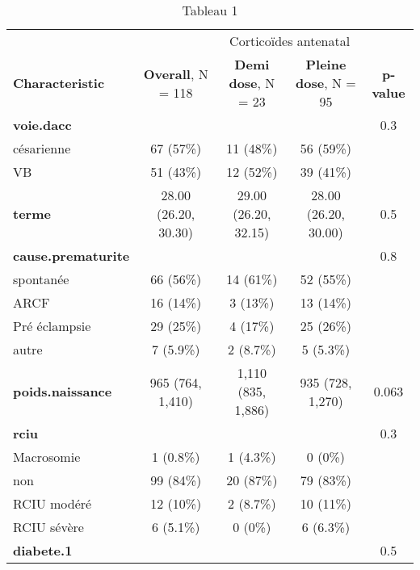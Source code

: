 \documentclass[
  10pt,
  a4paper,
]{scrartcl}
\begin{document}
\begin{table}

\caption{\label{tab:xtable1}Tableau 1}
\centering
\begin{tabular}[t]{l|c|c|c|c}
\hline
\multicolumn{2}{c|}{ } & \multicolumn{2}{c|}{Corticoïdes antenatal} & \multicolumn{1}{c}{ } \\
\cline{3-4}
\textbf{Characteristic} & \textbf{Overall}, N = 118 & \textbf{Demi dose}, N = 23 & \textbf{Pleine dose}, N = 95 & \textbf{p-value}\\
\hline
\textbf{voie.dacc} &  &  &  & 0.3\\
\hline
\hspace{1em}césarienne & 67 (57\%) & 11 (48\%) & 56 (59\%) & \\
\hline
\hspace{1em}VB & 51 (43\%) & 12 (52\%) & 39 (41\%) & \\
\hline
\textbf{terme} & 28.00 (26.20, 30.30) & 29.00 (26.20, 32.15) & 28.00 (26.20, 30.00) & 0.5\\
\hline
\textbf{cause.prematurite} &  &  &  & 0.8\\
\hline
\hspace{1em}spontanée & 66 (56\%) & 14 (61\%) & 52 (55\%) & \\
\hline
\hspace{1em}ARCF & 16 (14\%) & 3 (13\%) & 13 (14\%) & \\
\hline
\hspace{1em}Pré éclampsie & 29 (25\%) & 4 (17\%) & 25 (26\%) & \\
\hline
\hspace{1em}autre & 7 (5.9\%) & 2 (8.7\%) & 5 (5.3\%) & \\
\hline
\textbf{poids.naissance} & 965 (764, 1,410) & 1,110 (835, 1,886) & 935 (728, 1,270) & 0.063\\
\hline
\textbf{rciu} &  &  &  & 0.3\\
\hline
\hspace{1em}Macrosomie & 1 (0.8\%) & 1 (4.3\%) & 0 (0\%) & \\
\hline
\hspace{1em}non & 99 (84\%) & 20 (87\%) & 79 (83\%) & \\
\hline
\hspace{1em}RCIU modéré & 12 (10\%) & 2 (8.7\%) & 10 (11\%) & \\
\hline
\hspace{1em}RCIU sévère & 6 (5.1\%) & 0 (0\%) & 6 (6.3\%) & \\
\hline
\textbf{diabete.1} &  &  &  & 0.5\\

\end{tabular}
\end{table}
\end{document}
